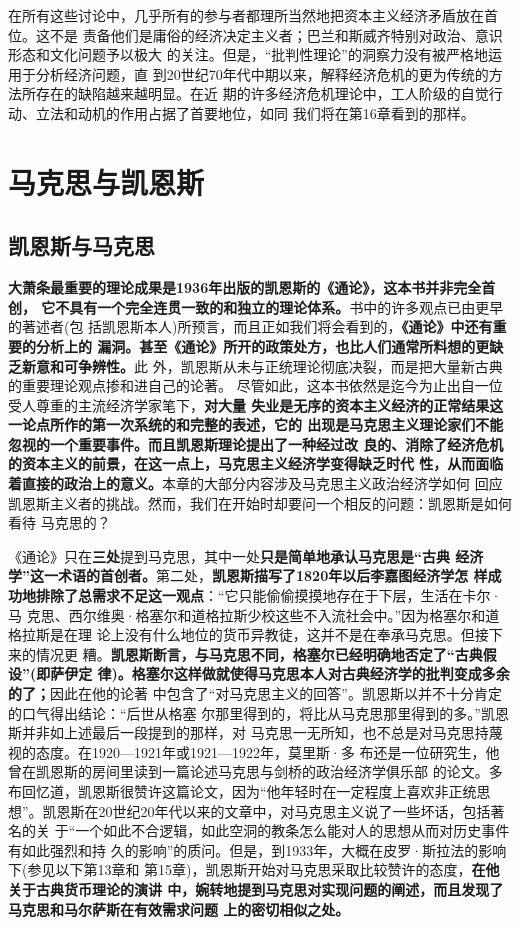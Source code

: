 在所有这些讨论中，几乎所有的参与者都理所当然地把资本主义经济矛盾放在首位。这不是
责备他们是庸俗的经济决定主义者；巴兰和斯威齐特别对政治、意识形态和文化问题予以极大
的关注。但是，“批判性理论”的洞察力没有被严格地运用于分析经济问题，直
到20世纪70年代中期以来，解释经济危机的更为传统的方法所存在的缺陷越来越明显。在近
期的许多经济危机理论中，工人阶级的自觉行动、立法和动机的作用占据了首要地位，如同
我们将在第16章看到的那样。



\chapter{马克思与凯恩斯}
\section{凯恩斯与马克思}
\textbf{大萧条最重要的理论成果是1936年出版的凯恩斯的《通论》，这本书并非完全首创，
  它不具有一个完全连贯一致的和独立的理论体系。}书中的许多观点已由更早的著述者(包
括凯恩斯本人)所预言，而且正如我们将会看到的，\textbf{《通论》中还有重要的分析上的
  漏洞。甚至《通论》所开的政策处方，也比人们通常所料想的更缺乏新意和可争辨性。}此
外，凯恩斯从未与正统理论彻底决裂，而是把大量新古典的重要理论观点掺和进自己的论著。
尽管如此，这本书依然是迄今为止出自一位受人尊重的主流经济学家笔下，\textbf{对大量
  失业是无序的资本主义经济的正常结果这一论点所作的第一次系统的和完整的表述，它的
  出现是马克思主义理论家们不能忽视的一个重要事件。而且凯恩斯理论提出了一种经过改
  良的、消除了经济危机的资本主义的前景，在这一点上，马克思主义经济学变得缺乏时代
  性，从而面临着直接的政治上的意义。}本章的大部分内容涉及马克思主义政治经济学如何
回应凯恩斯主义者的挑战。然而，我们在开始时却要问一个相反的问题：凯恩斯是如何看待
马克思的？

《通论》只在\textbf{三处}提到马克思，其中一处\textbf{只是简单地承认马克思是“古典
  经济学”这一术语的首创者。}第二处，\textbf{凯恩斯描写了1820年以后李嘉图经济学怎
  样成功地排除了总需求不足这一观点}：“它只能偷偷摸摸地存在于下层，生活在卡尔·马
克思、西尔维奥·格塞尔和道格拉斯少校这些不入流社会中。”因为格塞尔和道格拉斯是在理
论上没有什么地位的货币异教徒，这并不是在奉承马克思。但接下来的情况更
糟。\textbf{凯恩斯断言，与马克思不同，格塞尔已经明确地否定了“古典假设”(即萨伊定
  律)。格塞尔这样做就使得马克思本人对古典经济学的批判变成多余的了；}因此在他的论著
中包含了“对马克思主义的回答”。凯恩斯以并不十分肯定的口气得出结论：“后世从格塞
尔那里得到的，将比从马克思那里得到的多。”凯恩斯并非如上述最后一段提到的那样，对
马克思一无所知，也不总是对马克思持蔑视的态度。在1920—1921年或1921—1922年，莫里斯·多
布还是一位研究生，他曾在凯恩斯的房间里读到一篇论述马克思与剑桥的政治经济学俱乐部
的论文。多布回忆道，凯恩斯很赞许这篇论文，因为“他年轻时在一定程度上喜欢非正统思
想”。凯恩斯在20世纪20年代以来的文章中，对马克思主义说了一些坏话，包括著名的关
于“一个如此不合逻辑，如此空洞的教条怎么能对人的思想从而对历史事件有如此强烈和持
久的影响”的质问。但是，到1933年，大概在皮罗·斯拉法的影响下(参见以下第13章和
第15章)，凯恩斯开始对马克思采取比较赞许的态度，\textbf{在他关于古典货币理论的演讲
  中，婉转地提到马克思对实现问题的阐述，而且发现了马克思和马尔萨斯在有效需求问题
  上的密切相似之处。}

